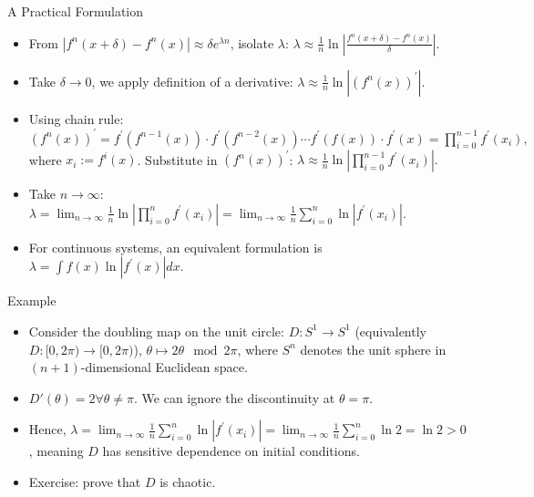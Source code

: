 \documentclass[aspectratio=169]{beamer}
\begin{document}
\begin{frame}{A Practical Formulation}
\begin{itemize}
    \item From $\left|f^n(x+\delta)-f^n(x)\right| \approx \delta e^{\lambda n}$, isolate $\lambda$: $\lambda \approx \frac{1}{n} \ln{\left|\frac{f^n(x+\delta)-f^n(x)}{\delta}\right|}$. \\
    \item Take $\delta \rightarrow 0$, we apply definition of a derivative: $\lambda\approx\frac{1}{n}\ln{\left|(f^n(x))^\prime\right|}.$\\
    \item Using chain rule: $(f^n(x))^\prime = f^\prime(f^{n-1}(x)) \cdot f^\prime(f^{n-2}(x)) \cdots f^\prime(f(x)) \cdot f^\prime(x)=\displaystyle \prod_{i=0}^{n-1} f^\prime(x_i),$
    where $x_i := f^{i}(x)$. Substitute in $(f^n(x))^\prime$: $\lambda\approx\displaystyle\frac{1}{n}\ln{\left| \prod_{i=0}^{n-1} f^\prime(x_i)\right|}.$\\
    \item Take $n \rightarrow \infty$: $\lambda=\displaystyle \lim_{n\to\infty}\frac{1}{n}\ln{\left| \prod_{i=0}^{n} f^\prime(x_i)\right|}=\displaystyle\lim_{n\to\infty} \frac{1}{n}\sum_{i=0}^{n}\ln{\left|  f^\prime(x_i)\right|}.$\\
    \item For continuous systems, an equivalent formulation is $\lambda = \int f(x)\ln{\left|  f^\prime(x)\right|}dx.$
\end{itemize}
\end{frame}

\begin{frame}{Example}
    \begin{itemize}
        \item Consider the doubling map on the unit circle: $D:S^1\rightarrow S^1$ (equivalently $D:[0,2\pi)\rightarrow[0,2\pi)$), $\theta \mapsto 2\theta \mod 2\pi$, where $S^n$ denotes the unit sphere in $(n+1)$-dimensional Euclidean space.
        \item $D'(\theta)=2 \forall \theta \neq \pi$. We can ignore the discontinuity at $\theta = \pi$. 
        \item Hence, $\lambda =\displaystyle\lim_{n\to\infty} \frac{1}{n}\sum_{i=0}^{n}\ln{\left| f^\prime(x_i)\right|} = \displaystyle\lim_{n\to\infty} \frac{1}{n}\sum_{i=0}^{n}\ln2 = \ln2 > 0$, meaning $D$ has sensitive dependence on initial conditions. 
        \item Exercise: prove that $D$ is chaotic. 
    \end{itemize}
\end{frame}
\end{document}
